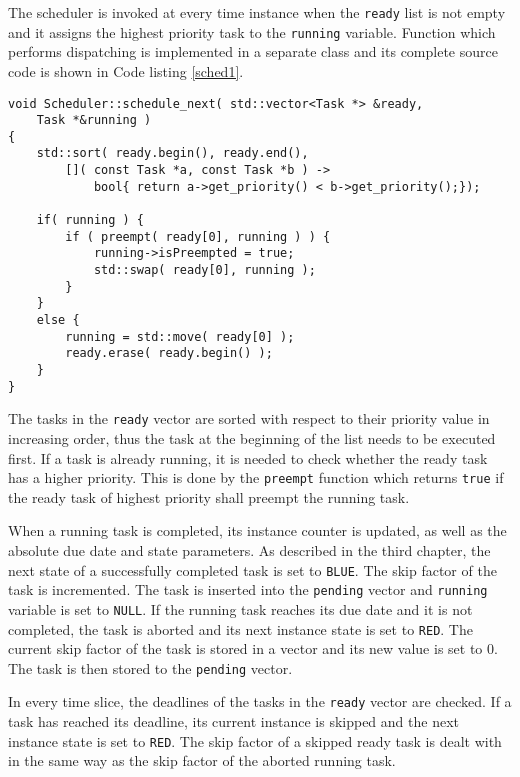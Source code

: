 The scheduler is invoked at every time instance when the \texttt{ready} list is not empty and it assigns the highest priority task to the \texttt{running} variable.
Function which performs dispatching is implemented in a separate class and its complete source code is shown in Code listing \ref{sched1}.
\begin{lstlisting}[frame=none, label={sched1}, caption={The \texttt{schedule\_next} method.}, captionpos=b]
void Scheduler::schedule_next( std::vector<Task *> &ready, 
	Task *&running )
{
    std::sort( ready.begin(), ready.end(),
        []( const Task *a, const Task *b ) -> 
            bool{ return a->get_priority() < b->get_priority();});

    if( running ) {
        if ( preempt( ready[0], running ) ) {
            running->isPreempted = true;
            std::swap( ready[0], running );
        }
    }
    else {
        running = std::move( ready[0] );
        ready.erase( ready.begin() );
    }
}
\end{lstlisting}
The tasks in the \texttt{ready} vector are sorted with respect to their priority value in increasing order, thus the task at the beginning of the list needs to be executed first.
If a task is already running, it is needed to check whether the ready task has a higher priority.
This is done by the \texttt{preempt} function which returns \texttt{true} if the ready task of highest priority shall preempt the running task.

When a running task is completed,
its instance counter is updated, as well as the absolute due date and state parameters.
As described in the third chapter, the next state of a successfully completed task is set to 
\texttt{BLUE}.
The skip factor of the task is incremented.
The task is inserted into the \texttt{pending} vector and \texttt{running} variable is set to \texttt{NULL}.
If the running task reaches its due date and it is not completed, the task is aborted and its next instance state is set to \texttt{RED}.
The current skip factor of the task is stored in a vector and its new value is set to $0$.
The task is then stored to the \texttt{pending} vector.

In every time slice, the deadlines of the tasks in the \texttt{ready} vector are checked.
If a task has reached its deadline, its current instance is skipped and the next instance state is set to \texttt{RED}.
The skip factor of a skipped ready task is dealt with in the same way as the skip factor of the aborted running task.

